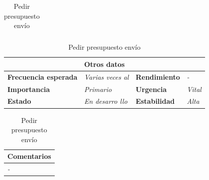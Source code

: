 \documentclass[12pt,spanish]{article}
\begin{document}
\begin{table}[H]
\begin{tabular}{|m{5pt}|m{7.33cm}|m{5pt}|m{7.33cm}|}
	\end{tabular}
	
	\vspace{0.5cm}
	
	\begin{tabular}{|m{3.75cm}|m{3.75cm}|m{3.75cm}|m{3.8cm}|}
		\hline
		\multicolumn{4}{|c|}{\textbf{Otros datos}} \\
		\hline
		\textbf{Frecuencia esperada} & \textit{Varias veces al} & \textbf{Rendimiento} & \textit{-} \\
		\hline
		\textbf{Importancia} & \textit{Primario} & \textbf{Urgencia} & \textit{Vital} \\
		\hline
		\textbf{Estado} & \textit{En desarro
		llo} & \textbf{Estabilidad} & \textit{Alta} \\
		\hline
	\end{tabular}
	
	\vspace{1cm}
	
	\begin{tabular}{|m{16.2cm}|}
		\hline
		\textbf{Comentarios} \\
		\hline
		\textit{-} \\
		\hline
	\end{tabular}
	
	\caption{Pedir presupuesto envío}
	
\end{table}
\end{document}
